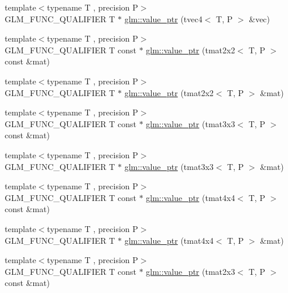\begin{DoxyCompactItemize}
{\footnotesize template$<$typename T , precision P$>$ }\\G\+L\+M\+\_\+\+F\+U\+N\+C\+\_\+\+Q\+U\+A\+L\+I\+F\+I\+E\+R T $\ast$ \hyperlink{group__gtc__type__ptr_ga4c19763f3c5991b9dc88a3ffdd9ea6cd}{glm\+::value\+\_\+ptr} (tvec4$<$ T, P $>$ \&vec)
\item 
{\footnotesize template$<$typename T , precision P$>$ }\\G\+L\+M\+\_\+\+F\+U\+N\+C\+\_\+\+Q\+U\+A\+L\+I\+F\+I\+E\+R T const $\ast$ \hyperlink{group__gtc__type__ptr_ga2d709523aa0beb0a42433f80c9d07718}{glm\+::value\+\_\+ptr} (tmat2x2$<$ T, P $>$ const \&mat)
\item 
{\footnotesize template$<$typename T , precision P$>$ }\\G\+L\+M\+\_\+\+F\+U\+N\+C\+\_\+\+Q\+U\+A\+L\+I\+F\+I\+E\+R T $\ast$ \hyperlink{group__gtc__type__ptr_gac7256e14328e818e61276fa5e6176b9d}{glm\+::value\+\_\+ptr} (tmat2x2$<$ T, P $>$ \&mat)
\item 
{\footnotesize template$<$typename T , precision P$>$ }\\G\+L\+M\+\_\+\+F\+U\+N\+C\+\_\+\+Q\+U\+A\+L\+I\+F\+I\+E\+R T const $\ast$ \hyperlink{group__gtc__type__ptr_ga0fd20ac385befba86cf2bbf836728bc2}{glm\+::value\+\_\+ptr} (tmat3x3$<$ T, P $>$ const \&mat)
\item 
{\footnotesize template$<$typename T , precision P$>$ }\\G\+L\+M\+\_\+\+F\+U\+N\+C\+\_\+\+Q\+U\+A\+L\+I\+F\+I\+E\+R T $\ast$ \hyperlink{group__gtc__type__ptr_ga4470e16d0e844cb2c4f7b2e731824f87}{glm\+::value\+\_\+ptr} (tmat3x3$<$ T, P $>$ \&mat)
\item 
{\footnotesize template$<$typename T , precision P$>$ }\\G\+L\+M\+\_\+\+F\+U\+N\+C\+\_\+\+Q\+U\+A\+L\+I\+F\+I\+E\+R T const $\ast$ \hyperlink{group__gtc__type__ptr_ga2edadf5433694bf018d62db962b61321}{glm\+::value\+\_\+ptr} (tmat4x4$<$ T, P $>$ const \&mat)
\item 
{\footnotesize template$<$typename T , precision P$>$ }\\G\+L\+M\+\_\+\+F\+U\+N\+C\+\_\+\+Q\+U\+A\+L\+I\+F\+I\+E\+R T $\ast$ \hyperlink{group__gtc__type__ptr_ga1fc49ab60e5afdd4821a6903e92244a4}{glm\+::value\+\_\+ptr} (tmat4x4$<$ T, P $>$ \&mat)
\item 
{\footnotesize template$<$typename T , precision P$>$ }\\G\+L\+M\+\_\+\+F\+U\+N\+C\+\_\+\+Q\+U\+A\+L\+I\+F\+I\+E\+R T const $\ast$ \hyperlink{group__gtc__type__ptr_ga968f2c8899914ea1c1daaaded8daa6b5}{glm\+::value\+\_\+ptr} (tmat2x3$<$ T, P $>$ const \&mat)

\end{DoxyCompactItemize}
